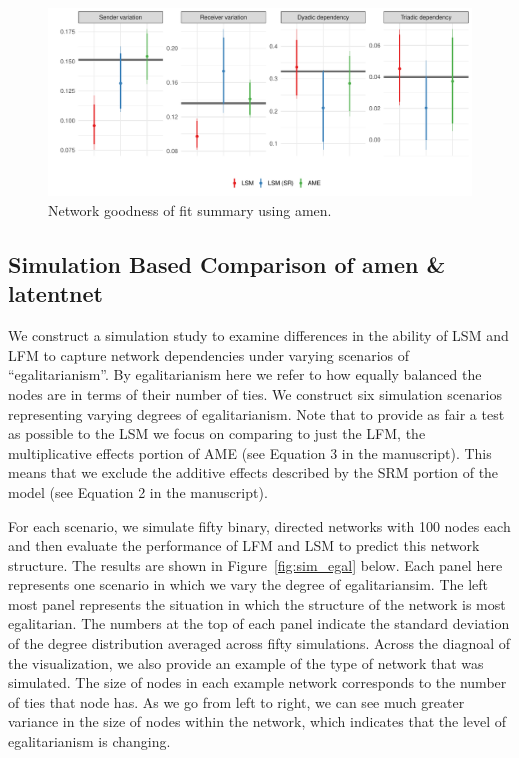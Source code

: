 \documentclass[12pt,pdflatex]{elsarticle}
\newcommand{\pkg}[1]{{\fontseries{b}\selectfont #1}}
\begin{document}
\begin{figure}[ht]
	\centering
	\includegraphics[width=1\textwidth]{netPerfCoef_latSpaceSmall}
	\caption{Network goodness of fit summary using \pkg{amen}.}
	\label{fig:netPerfCoef_latSpace}
\end{figure}

\FloatBarrier

\subsection*{Simulation Based Comparison of \pkg{amen} \& \pkg{latentnet}}

We construct a simulation study to examine differences in the ability of LSM and LFM to capture network dependencies under varying scenarios of ``egalitarianism''. By egalitarianism here we refer to how equally balanced the nodes are in terms of their number of ties. We construct six simulation scenarios representing varying degrees of egalitarianism. Note that to provide as fair a test as possible to the LSM we focus on comparing to just the LFM, the multiplicative effects portion of AME (see Equation 3 in the manuscript). This means that we exclude the additive effects described by the SRM portion of the model (see Equation 2 in the manuscript). 

For each scenario, we simulate fifty binary, directed networks with 100 nodes each and then evaluate the performance of LFM and LSM to predict this network structure. The results are shown in Figure~\ref{fig:sim_egal} below. Each panel here represents one scenario in which we vary the degree of egalitariansim. The left most panel represents the situation in which the structure of the network is most egalitarian. The numbers at the top of each panel indicate the standard deviation of the degree distribution averaged across fifty simulations. Across the diagnoal of the visualization, we also provide an example of the type of network that was simulated. The size of nodes in each example network corresponds to the number of ties that node has. As we go from left to right, we can see much greater variance in the size of nodes within the network, which indicates that the level of egalitarianism is changing. 
\end{document}
